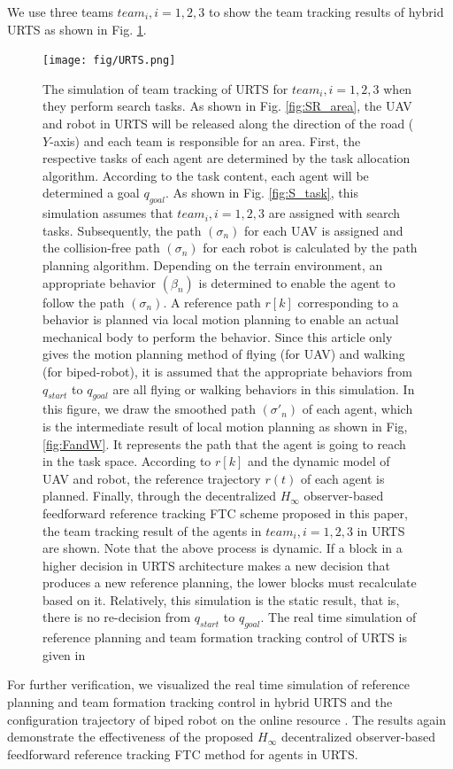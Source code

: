 \documentclass[journal,12pt,onecolumn,draftclsnofoot,]{IEEEtran}
\begin{document}
We use three teams $team_i, i=1, 2, 3$ to show the team tracking results of hybrid URTS as shown in Fig. \ref{fig:URTS}.
\begin{figure}[htbp]
    \centering
    \texttt{[image: fig/URTS.png]}\caption{The simulation of team tracking of URTS for $team_i,i=1,2,3$ when they perform search tasks. As shown in Fig. \ref{fig:SR_area}, the UAV and robot in URTS will be released along the direction of the road ($Y$-axis) and each team is responsible for an area. First, the respective tasks of each agent are determined by the task allocation algorithm. According to the task content, each agent will be determined a goal $q_{goal}$. As shown in Fig. \ref{fig:S_task}, this simulation assumes that $team_i,i=1,2,3$ are assigned with search tasks. Subsequently, the path $(\sigma_n)$ for each UAV is assigned and the collision-free path $(\sigma_n)$ for each robot is calculated by the path planning algorithm. Depending on the terrain environment, an appropriate behavior $(\beta_n)$ is determined to enable the agent to follow the path $(\sigma_n)$. A reference path $r[k]$ corresponding to a behavior is planned via local motion planning to enable an actual mechanical body to perform the behavior. Since this article only gives the motion planning method of flying (for UAV) and walking (for biped-robot), it is assumed that the appropriate behaviors from $q_{start}$ to $q_{goal}$ are all flying or walking behaviors in this simulation. In this figure, we draw the smoothed path $(\sigma'_n)$ of each agent, which is the intermediate result of local motion planning as shown in Fig, \ref{fig:FandW}. It represents the path that the agent is going to reach in the task space. According to $r[k]$ and the dynamic model of UAV and robot, the reference trajectory $r(t)$ of each agent is planned. Finally, through the decentralized $H_\infty$ observer-based feedforward reference tracking FTC scheme proposed in this paper, the team tracking result of the agents in $team_i, i=1,2,3$ in URTS are shown. Note that the above process is dynamic. If a block in a higher decision in URTS architecture makes a new decision that produces a new reference planning, the lower blocks must recalculate based on it. Relatively, this simulation is the static result, that is, there is no re-decision from $q_{start}$ to $q_{goal}$. The real time simulation of reference planning and team formation tracking control of URTS is given in \cite{mySimulation}}
    \label{fig:URTS}
\end{figure}

For further verification, we visualized the real time simulation of reference planning and team formation tracking control in hybrid URTS and the configuration trajectory of biped robot on the online resource \cite{mySimulation}. The results again demonstrate the effectiveness of the proposed $H_\infty$ decentralized observer-based feedforward reference tracking FTC method for agents in URTS.
\end{document}
